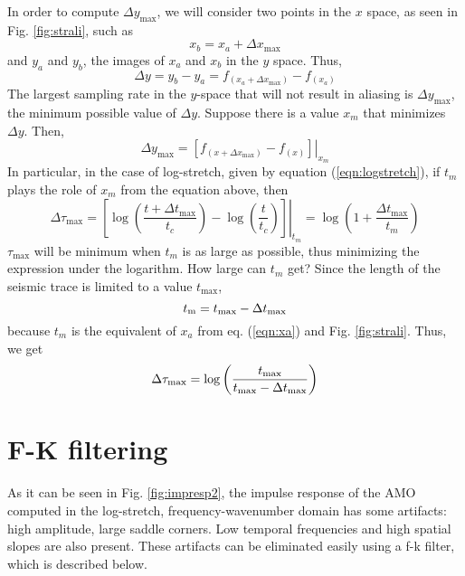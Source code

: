 
In order to compute $\Delta y_{\max }$, we will consider two points in the $x$ space, as seen in Fig. \ref{fig:strali}, such as
\begin{equation}
\label{eqn:xa}
x_b  = x_a  + \Delta x_{\max } 
\end{equation}
and $y_a$ and $y_b$, the images of  $x_a$ and $x_b$ in the $y$ space. Thus,
\[
\Delta y = y_b  - y_a  = f_{(x_a  + \Delta x_{\max } )}  - f_{(x_a )} 
\]
The largest sampling rate in the $y$-space that will not result in aliasing is $\Delta y_{\max }$, the minimum possible value of $\Delta y$. Suppose there is a value $x_m$ that minimizes $\Delta y$. Then,
\[
\Delta y_{\max }  = \left. {\left[ {f_{(x + \Delta x_{\max } )}  - f_{(x)} } \right]} \right|_{x_m } 
\]
In particular, in the case of log-stretch, given by equation (\ref{eqn:logstretch}), if $t_m$ plays the role of $x_m$ from the equation above, then
\begin{equation}
\label{eqn:tempojunk}
\Delta \tau _{\max }  = \left. {\left[ {\log \left( {\frac{{t + \Delta t_{\max } }}{{t_c }}} \right) - \log \left( {\frac{t}{{t_c }}} \right)} \right]} \right|_{t_m }  = \log \left( {1 + \frac{{\Delta t_{\max } }}{{t_m }}} \right)
\end{equation}
$\tau_{\max }$ will be minimum when $t_m$ is as large as possible,
thus minimizing the expression under the logarithm. How large can $t_m$ get? Since the length of the seismic trace is limited to a value $t_{\max }$, 
\[
t_{\mathop{\rm m}\nolimits}   = t_{\max }  - \Delta t_{\max } 
\]
because $t_m$ is the equivalent of $x_a$ from eq. (\ref{eqn:xa}) and Fig. \ref{fig:strali}. Thus, we get
\begin{equation}
\label{eqn:deltataumax}
\Delta \tau _{{\rm max}}  = \log \left( {\frac{{t_{\max } }}{{t_{\max }  - \Delta t_{\max } }}} \right)
\end{equation}

\section{F-K filtering}
As it can be seen in Fig. \ref{fig:impresp2}, the impulse response of
the AMO computed in the log-stretch, frequency-wavenumber domain has
some artifacts: high amplitude, large saddle corners. Low temporal
frequencies and high spatial slopes are also present. These artifacts can be eliminated easily
using a f-k filter, which is described below.

